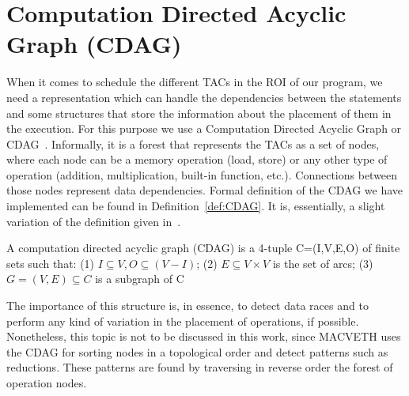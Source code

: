 \section{Computation Directed Acyclic Graph (CDAG)}
When it comes to schedule the different TACs in the ROI of our program, we need
a representation which can handle the dependencies between the statements and
some structures that store the information about the placement of them in the
execution. For this purpose we use a Computation Directed Acyclic Graph or
CDAG~\cite{bib:CDAGdefinition}. Informally, it is a forest that represents the
TACs as a set of nodes, where
each node can be a memory operation (load, store) or any other type of
operation (addition, multiplication, built-in function, etc.). Connections
between those nodes represent data dependencies. Formal
definition of the CDAG we have implemented can be found in
Definition~\ref{def:CDAG}. It is, essentially, a slight variation
of the definition given in~\cite{bib:CDAGdefinition}.

\theoremstyle{definition}
\begin{definition}\label{def:CDAG}
	A computation directed acyclic graph (CDAG) is a 4-tuple C=(I,V,E,O) of
	finite sets such that: (1) $I \subseteq V, O \subseteq (V-I)$; (2) $E
		\subseteq V
		\times V$ is the set of arcs; (3) $G=(V,E) \subseteq C$ is a subgraph 
		of C
\end{definition}

The importance of this structure is, in essence, to detect data races and to 
perform any kind of variation in the placement of operations, if possible. 
Nonetheless, this topic is not to be discussed in this work, since MACVETH uses 
the CDAG for sorting nodes in a topological order and detect patterns such as 
reductions. These patterns are found by traversing in reverse order the forest 
of operation nodes.

